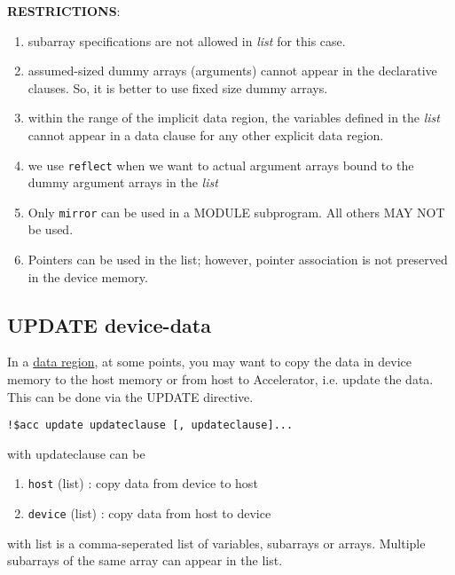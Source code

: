 {\bf RESTRICTIONS}: 
\begin{enumerate}
\item subarray specifications are not allowed in {\it list} for
this case.
\item assumed-sized dummy arrays (arguments) cannot appear in the
  declarative clauses. So, it is better to use fixed size dummy
  arrays. 
\item within the range of the implicit data region, the variables
  defined in the {\it list} cannot appear in a data clause for any
  other explicit data region.
\item we use \verb!reflect! when we want to actual argument arrays
  bound to the dummy argument arrays in the {\it list}

\item Only \verb!mirror! can be used in a MODULE subprogram. All
  others MAY NOT be used. 
\item Pointers can be used in the list; however, pointer association
  is not preserved in the device memory.
\end{enumerate}

\subsection{UPDATE device-data}
\label{sec:update-device-data}

In a \hyperref[sec:define-data-regions]{data region}, at some points,
you may want to copy the data in device memory to the host memory or
from host to Accelerator, i.e. update the data. This can be done via
the UPDATE directive.

\begin{lstlisting}
!$acc update updateclause [, updateclause]...
\end{lstlisting}
with updateclause can be 
\begin{enumerate}
\item \verb!host! (list) : copy data from device to host

\item \verb!device! (list) : copy data from host to device
\end{enumerate}
with list is a comma-seperated list of variables, subarrays or
arrays. Multiple subarrays of the same array can appear in the list. 

